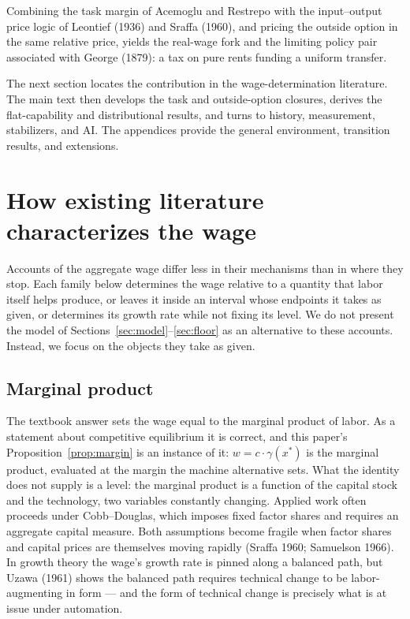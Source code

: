 \documentclass[12pt]{article}
\theoremstyle{plain}
\begin{document}
Combining the task margin of Acemoglu and Restrepo with the input--output price logic of Leontief (1936) and Sraffa (1960), and pricing the outside option in the same relative price, yields the real-wage fork and the limiting policy pair associated with George (1879): a tax on pure rents funding a uniform transfer.

The next section locates the contribution in the wage-determination
literature. The main text then develops the task and outside-option closures,
derives the flat-capability and distributional results, and turns to history,
measurement, stabilizers, and AI. The appendices provide the general
environment, transition results, and extensions.

\section{How existing literature characterizes the wage}\label{sec:accounts}

Accounts of the aggregate wage differ less in their mechanisms than in where they stop. Each family below determines the wage relative to a quantity that labor itself helps produce, or leaves it inside an interval whose endpoints it takes as given, or determines its growth rate while not fixing its level. We do not present the model of Sections~\ref{sec:model}--\ref{sec:floor} as an alternative to these accounts. Instead, we focus on the objects they take as given.

\subsection{Marginal product}\label{sec:marginal-product}

The textbook answer sets the wage equal to the marginal product of labor. As a statement about competitive equilibrium it is correct, and this paper's Proposition~\ref{prop:margin} is an instance of it: $w = c\cdot \gamma (x^*)$  is the marginal product, evaluated at the margin the machine alternative sets. What the identity does not supply is a level: the marginal product is a function of the capital stock and the technology, two variables constantly changing. Applied work often proceeds under Cobb--Douglas, which imposes fixed factor shares and requires an aggregate capital measure. Both assumptions become fragile when factor shares and capital prices are themselves moving rapidly (Sraffa 1960; Samuelson 1966). In growth theory the wage's growth rate is pinned along a balanced path, but Uzawa (1961) shows the balanced path requires technical change to be labor-augmenting in form --- and the form of technical change is precisely what is at issue under automation.
\end{document}
